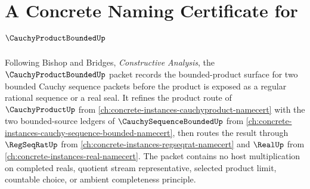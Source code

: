 \chapter{A Concrete Naming Certificate for $\CauchyProductBoundedUp$}
\label{ch:concrete-instances-cauchy-product-bounded-namecert}

Following Bishop and Bridges, \emph{Constructive Analysis}, the $\CauchyProductBoundedUp$ packet records the bounded-product surface for two bounded Cauchy sequence packets before the product is exposed as a regular rational sequence or a real seal. It refines the product route of $\CauchyProductUp$ from \autoref{ch:concrete-instances-cauchyproduct-namecert} with the two bounded-source ledgers of $\CauchySequenceBoundedUp$ from \autoref{ch:concrete-instances-cauchy-sequence-bounded-namecert}, then routes the result through $\RegSeqRatUp$ from \autoref{ch:concrete-instances-regseqrat-namecert} and $\RealUp$ from \autoref{ch:concrete-instances-real-namecert}. The packet contains no host multiplication on completed reals, quotient stream representative, selected product limit, countable choice, or ambient completeness principle.

